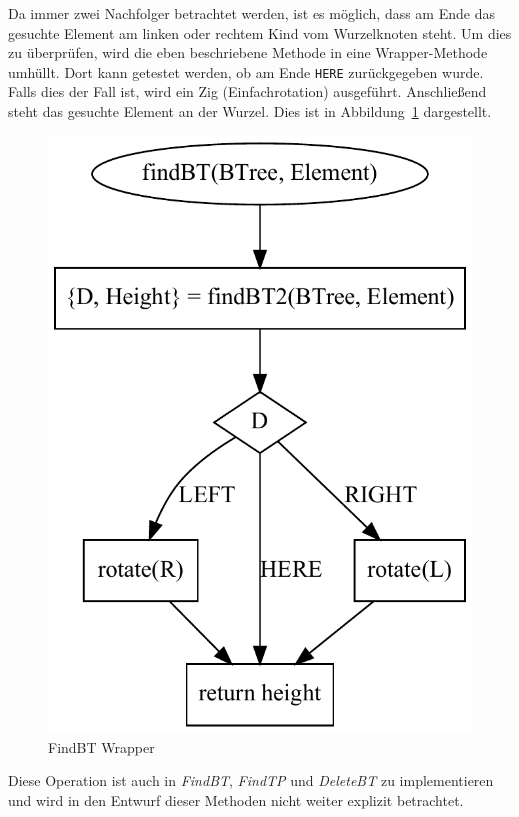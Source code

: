 Da immer zwei Nachfolger betrachtet werden, ist es möglich, dass am Ende das gesuchte Element
am linken oder rechtem Kind vom Wurzelknoten steht.
Um dies zu überprüfen, wird die eben beschriebene Methode in eine Wrapper-Methode umhüllt.
Dort kann getestet werden, ob am Ende \verb|HERE| zurückgegeben wurde.
Falls dies der Fall ist, wird ein Zig (Einfachrotation) ausgeführt.
Anschließend steht das gesuchte Element an der Wurzel.
Dies ist in Abbildung~\ref{fig:splayFind2} dargestellt.
\begin{figure}[hbt]
    \centering
    \includegraphics[scale = 0.35]{img/gv/splayFind}
    \caption{FindBT Wrapper}
    \label{fig:splayFind2}
\end{figure}
Diese Operation ist auch in \textit{FindBT}, \textit{FindTP} und \textit{DeleteBT} zu implementieren
und wird in den Entwurf dieser Methoden nicht weiter explizit betrachtet.

